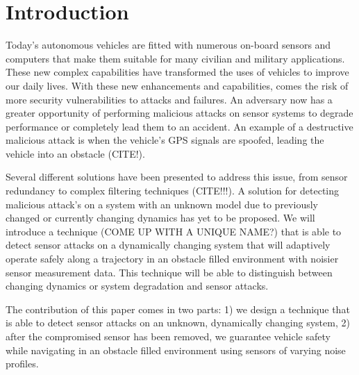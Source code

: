 
\section{Introduction} \label{sec:introduction}

Today's autonomous vehicles are fitted with numerous on-board sensors and computers that make them suitable for many civilian and military applications. These new complex capabilities have transformed the uses of vehicles to improve our daily lives. With these new enhancements and capabilities, comes the risk of more security vulnerabilities to attacks and failures. An adversary now has a greater opportunity of performing malicious attacks on sensor systems to degrade performance or completely lead them to an accident. An example of a destructive malicious attack is when the vehicle's GPS signals are spoofed, leading the vehicle into an obstacle (CITE!).

Several different solutions have been presented to address this issue, from sensor redundancy to complex filtering techniques (CITE!!!). A solution for detecting malicious attack's on a system with an unknown model due to previously changed or currently changing dynamics has yet to be proposed. We will introduce a technique (COME UP WITH A UNIQUE NAME?) that is able to detect sensor attacks on a dynamically changing system that will adaptively operate safely along a trajectory in an obstacle filled environment with noisier sensor measurement data. This technique will be able to distinguish between changing dynamics or system degradation and sensor attacks. 

The contribution of this paper comes in two parts: 1) we design a technique that is able to detect sensor attacks on an unknown, dynamically changing system, 2) after the compromised sensor has been removed, we guarantee vehicle safety while navigating in an obstacle filled environment using sensors of varying noise profiles.





